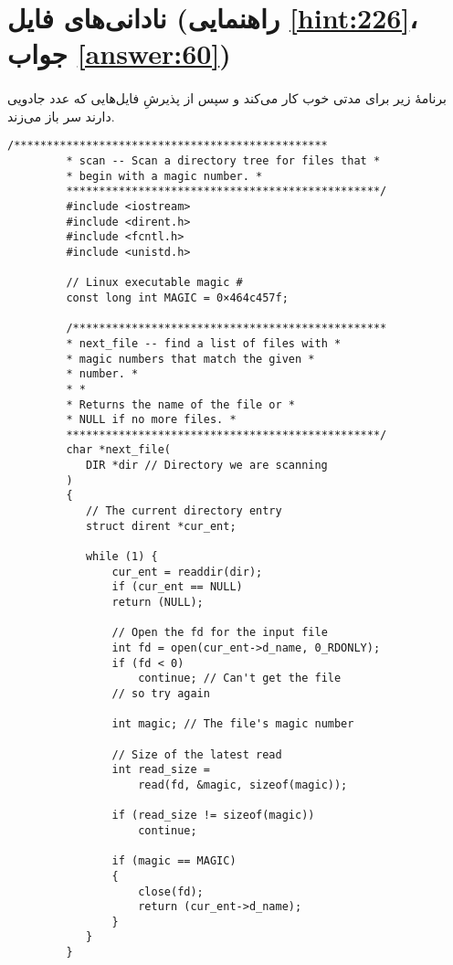 \section[نادانی‌های فایل]{نادانی‌های فایل \protect{} (راهنمایی \ref{hint:226}، جواب \ref{answer:60})}
\paragraph{}\label{prog:48}
برنامهٔ زیر برای مدتی خوب کار می‌کند و سپس از پذیرشِ فایل‌هایی که عدد جادویی دارند سر باز می‌زند.

\begin{LTR}
    \begin{lstlisting}[style=C++Style]
         /************************************************
         * scan -- Scan a directory tree for files that *
         * begin with a magic number. *
         ************************************************/
         #include <iostream>
         #include <dirent.h>
         #include <fcntl.h>
         #include <unistd.h>

         // Linux executable magic #
         const long int MAGIC = 0×464c457f;

         /************************************************
         * next_file -- find a list of files with *
         * magic numbers that match the given *
         * number. *
         * *
         * Returns the name of the file or *
         * NULL if no more files. *
         ************************************************/
         char *next_file(
         	DIR *dir // Directory we are scanning
         )
         {
         	// The current directory entry
         	struct dirent *cur_ent;

         	while (1) {
         		cur_ent = readdir(dir);
         		if (cur_ent == NULL)
         		return (NULL);

         		// Open the fd for the input file
         		int fd = open(cur_ent->d_name, 0_RDONLY);
         		if (fd < 0)
         			continue; // Can't get the file
         		// so try again

         		int magic; // The file's magic number

         		// Size of the latest read
         		int read_size =
         			read(fd, &magic, sizeof(magic));

         		if (read_size != sizeof(magic))
         			continue;

         		if (magic == MAGIC)
         		{
         			close(fd);
         			return (cur_ent->d_name);
         		}
         	}
         }


\end{lstlisting}
\end{LTR}

